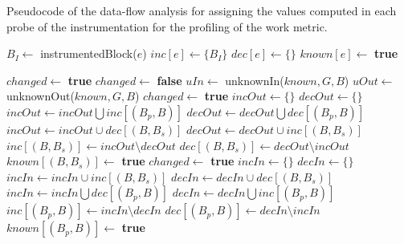 \documentclass[sigplan,9pt]{acmart}
\begin{document}
\begin{algorithm}[h]
  \caption{Pseudocode of the data-flow analysis for assigning the values computed
  in each probe of the instrumentation for the profiling of the work metric.}
  \label{alg:populateEdgeInfo}
  \begin{algorithmic}
    
       \State $B_I \gets $ \textrm{instrumentedBlock}($e$)
       \State $inc[e] \gets \{ B_I \}$
       \State $dec[e] \gets \{ \}$
       \State $known[e] \gets $ \textbf{true}
    \EndFor

    \State $changed \gets $ \textbf{true}
       \State $changed \gets $ \textbf{false}
          \State $uIn \gets $ \textrm{unknownIn}($known, G, B$)
          \State $uOut \gets $ \textrm{unknownOut}($known, G, B$)
             \State $changed \gets $ \textbf{true}
		     \State $incOut \gets \{\}$
			 \State $decOut \gets \{\}$
			    \State $incOut \gets incOut \bigcup inc[(B_p,B)]$
			    \State $decOut \gets decOut \bigcup dec[(B_p,B)]$
			 \EndFor
			    \State $incOut \gets incOut \cup dec[(B,B_s)]$
			    \State $decOut \gets decOut \cup inc[(B,B_s)]$
			 \EndFor
			       \State $inc[(B,B_s)] \gets incOut\setminus{decOut}$
			       \State $dec[(B,B_s)] \gets decOut\setminus{incOut}$
			       \State $known[(B,B_s)] \gets$ \textbf{true}
				\EndIf
			 \EndFor
		  \EndIf
             \State $changed \gets $ \textbf{true}
		     \State $incIn \gets \{\}$
			 \State $decIn \gets \{\}$
			    \State $incIn \gets incIn \cup inc[(B,B_s)]$
			    \State $decIn \gets decIn \cup dec[(B,B_s)]$
			 \EndFor
			    \State $incIn \gets incIn \bigcup dec[(B_p,B)]$
			    \State $decIn \gets decIn \bigcup inc[(B_p,B)]$
			 \EndFor
			       \State $inc[(B_p,B)] \gets incIn\setminus{decIn}$
			       \State $dec[(B_p,B)] \gets decIn\setminus{incIn}$
			       \State $known[(B_p,B)] \gets$ \textbf{true}
				\EndIf
			 \EndFor
		  \EndIf
	   \EndFor
    \EndWhile
    \EndFunction
  \end{algorithmic}
\end{algorithm}
\end{document}
